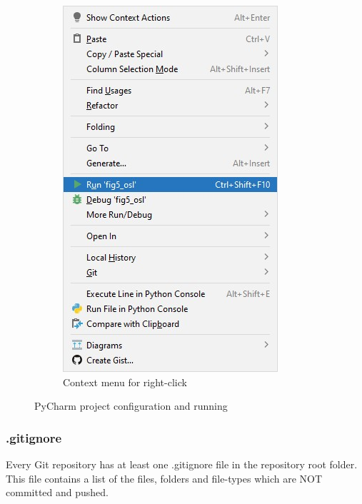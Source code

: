 \begin{figure}[H]
\begin{subfigure}[b]{0.3\textwidth}
		\includegraphics[width=\textwidth]{Figures/run.jpg}
		\caption{Context menu for right-click}
		\label{fig:pycharm_run}
	\end{subfigure}
	\caption{PyCharm project configuration and running}
	\label{fig:pycharm_config}
\end{figure}

\subsubsection{.gitignore}

Every Git repository has at least one \textsf{.gitignore} file in the repository root folder. This file contains a list of the files, folders and file-types which are NOT committed and pushed.

